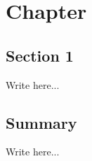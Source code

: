 \chapter{Chapter} 
\label{chap:4}
\section{Section 1}

Write here...

\section{Summary}

Write here...
